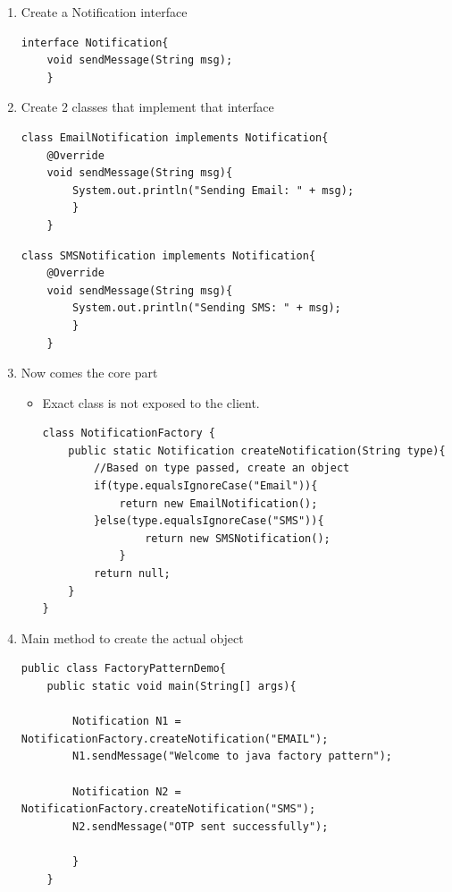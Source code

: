 \documentclass[11pt]{article}
\begin{document}
\begin{enumerate}
\item Create a Notification interface
\label{sec:orge7f85b2}
\begin{verbatim}
interface Notification{
    void sendMessage(String msg);
    }
\end{verbatim}
\item Create 2 classes that implement that interface
\label{sec:org73bfd3a}

\begin{verbatim}
class EmailNotification implements Notification{
    @Override
    void sendMessage(String msg){
        System.out.println("Sending Email: " + msg);
        }
    }
\end{verbatim}


\begin{verbatim}
class SMSNotification implements Notification{
    @Override
    void sendMessage(String msg){
        System.out.println("Sending SMS: " + msg);
        }
    }
\end{verbatim}
\item Now comes the core part
\label{sec:org66e547e}
\begin{itemize}
\item Exact class is not exposed to the client.

\begin{verbatim}
class NotificationFactory {
    public static Notification createNotification(String type){
        //Based on type passed, create an object
        if(type.equalsIgnoreCase("Email")){
            return new EmailNotification();
        }else(type.equalsIgnoreCase("SMS")){
                return new SMSNotification();
            }
        return null;
    }
}
\end{verbatim}
\end{itemize}
\item Main method to create the actual object
\label{sec:orga2d0b1d}
\begin{verbatim}
public class FactoryPatternDemo{
    public static void main(String[] args){

        Notification N1 = NotificationFactory.createNotification("EMAIL");
        N1.sendMessage("Welcome to java factory pattern");

        Notification N2 = NotificationFactory.createNotification("SMS");
        N2.sendMessage("OTP sent successfully");

        }
    }

\end{verbatim}
\end{enumerate}
\end{document}
